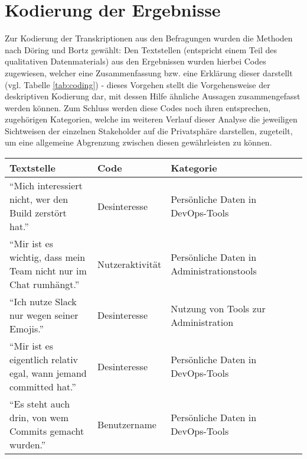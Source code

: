 \section{Kodierung der Ergebnisse}
Zur Kodierung der Transkriptionen aus den Befragungen wurden die Methoden nach Döring und Bortz gewählt: Den Textstellen (entspricht einem Teil des qualitativen Datenmaterials) aus den Ergebnissen wurden hierbei 
Codes zugewiesen, welcher eine Zusammenfassung bzw. eine Erklärung dieser darstellt \cite{Doring:2014aa} (vgl. Tabelle \ref{tab:coding}) - dieses Vorgehen stellt die Vorgehensweise der deskriptiven Kodierung dar, mit
dessen Hilfe ähnliche Aussagen zusammengefasst werden können. \newline Zum Schluss werden diese Codes noch ihren entsprechen, zugehörigen Kategorien, welche im weiteren Verlauf dieser Analyse die jeweiligen Sichtweisen der einzelnen
Stakeholder auf die Privatsphäre darstellen, zugeteilt, um eine allgemeine Abgrenzung zwischen diesen gewährleisten zu können.
\begin{table*}[t]
    \caption{Repräsentatives Codierungs- und Kategorisierungsbeispiel der erhobenen Daten (in Anlehnung an \cite{Doring:2014aa})}
    \label{tab:coding}
    \centering
    \small %
    {\renewcommand{\arraystretch}{1.3} %
    \begin{tabularx}{\linewidth}{@{}llXlcc@{}} %
      \toprule
      Textstelle & Code & Kategorie \\
      \midrule
        \enquote{Mich interessiert nicht, wer den Build zerstört hat.}                  & Desinteresse                  & Persönliche Daten in DevOps-Tools             \\
        \enquote{Mir ist es wichtig, dass mein Team nicht nur im Chat rumhängt.}        & Nutzeraktivität               & Persönliche Daten in Administrationstools     \\
        \enquote{Ich nutze Slack nur wegen seiner Emojis.}                              & Desinteresse                  & Nutzung von Tools zur Administration          \\
        \enquote{Mir ist es eigentlich relativ egal, wann jemand committed hat.}        & Desinteresse                  & Persönliche Daten in DevOps-Tools             \\
        \enquote{Es steht auch drin, von wem Commits gemacht wurden.}                   & Benutzername                  & Persönliche Daten in DevOps-Tools             \\
      \bottomrule
    \end{tabularx}
    }
  \end{table*}
